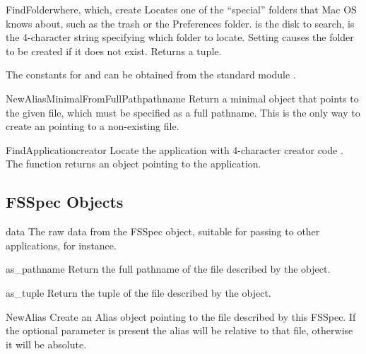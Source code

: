 \begin{funcdesc}{FindFolder}{where, which, create}
Locates one of the ``special'' folders that Mac OS knows about, such as
the trash or the Preferences folder.  is the disk to
search,  is the 4-character string specifying which folder to
locate. Setting  causes the folder to be created if it
does not exist. Returns a  tuple.

The constants for  and  can be obtained from the
standard module .
\end{funcdesc}

\begin{funcdesc}{NewAliasMinimalFromFullPath}{pathname}
Return a minimal  object that points to the given file, which
must be specified as a full pathname. This is the only way to create an
 pointing to a non-existing file.

\end{funcdesc}

\begin{funcdesc}{FindApplication}{creator}
Locate the application with 4-character creator code . The
function returns an  object pointing to the application.
\end{funcdesc}


\subsection{FSSpec Objects \label{fsspec-objects}}

\begin{memberdesc}[FSSpec]{data}
The raw data from the FSSpec object, suitable for passing
to other applications, for instance.
\end{memberdesc}

\begin{methoddesc}[FSSpec]{as_pathname}{}
Return the full pathname of the file described by the 
object.
\end{methoddesc}

\begin{methoddesc}[FSSpec]{as_tuple}{}
Return the  tuple of
the file described by the  object.
\end{methoddesc}

\begin{methoddesc}[FSSpec]{NewAlias}{}
Create an Alias object pointing to the file described by this
FSSpec. If the optional  parameter is present the alias
will be relative to that file, otherwise it will be absolute.
\end{methoddesc}

